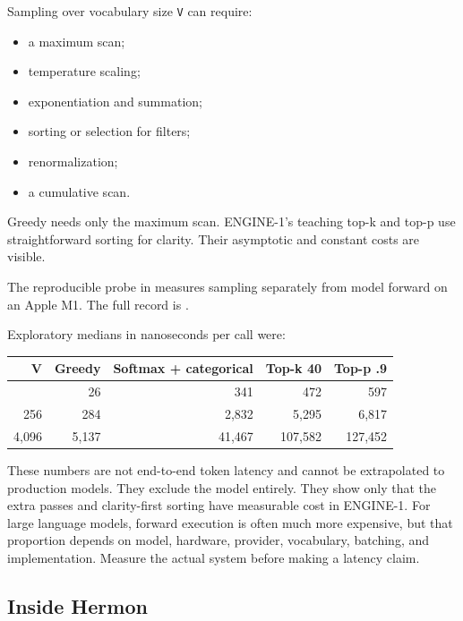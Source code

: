\documentclass[
  10pt,
]{article}
\newcounter{none} %
\providecommand{\tightlist}{%
  \setlength{\itemsep}{0pt}\setlength{\parskip}{0pt}}
\begin{document}
Sampling over vocabulary size \texttt{V} can require:

\begin{itemize}
\tightlist
\item
  a maximum scan;
\item
  temperature scaling;
\item
  exponentiation and summation;
\item
  sorting or selection for filters;
\item
  renormalization;
\item
  a cumulative scan.
\end{itemize}

Greedy needs only the maximum scan. ENGINE-1's teaching top-k and top-p
use straightforward sorting for clarity. Their asymptotic and constant
costs are visible.

The reproducible probe in
\texttt{}
measures sampling separately from model forward on an Apple M1. The full
record is
\href{https://github.com/hermonai/inside-the-llm-engine/blob/astra-visual-rewrite/research/benchmarks/chapter-04-sampling-cost.md}{\texttt{}}.

Exploratory medians in nanoseconds per call were:

{\def\LTcaptype{none} %
\begin{longtable}[]{@{}rrrrr@{}}
\toprule\noalign{}
V & Greedy & Softmax + categorical & Top-k 40 & Top-p .9 \\
\midrule\noalign{}
\endhead
\bottomrule\noalign{}
\endlastfoot
16 & 26 & 341 & 472 & 597 \\
256 & 284 & 2,832 & 5,295 & 6,817 \\
4,096 & 5,137 & 41,467 & 107,582 & 127,452 \\
\end{longtable}
}

These numbers are not end-to-end token latency and cannot be
extrapolated to production models. They exclude the model entirely. They
show only that the extra passes and clarity-first sorting have
measurable cost in ENGINE-1. For large language models, forward
execution is often much more expensive, but that proportion depends on
model, hardware, provider, vocabulary, batching, and implementation.
Measure the actual system before making a latency claim.

\subsection{Inside Hermon}\label{inside-hermon}
\end{document}
